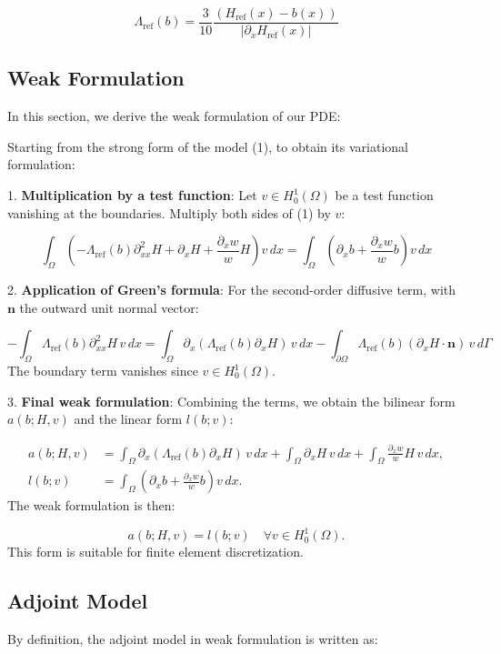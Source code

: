 \documentclass{article}
\begin{document}
\[
\Lambda_{\text{ref}}(b) = \frac{3}{10}\frac{(H_{\text{ref}}(x) - b(x))}{|\partial_{x}H_{\text{ref}}(x)|}
\]

\subsection{Weak Formulation}
In this section, we derive the weak formulation of our PDE:

Starting from the strong form of the model (1), to obtain its variational formulation:

1. \textbf{Multiplication by a test function}:  
Let \( v \in H^1_0(\Omega) \) be a test function vanishing at the boundaries. Multiply both sides of (1) by \( v \):

\[
\int_\Omega \left(-\Lambda_{\text{ref}}(b)\partial_{xx}^2H + \partial_xH + \frac{\partial_xw}{w}H\right)v \, dx = \int_\Omega \left(\partial_xb + \frac{\partial_xw}{w}b\right)v \, dx
\]

2. \textbf{Application of Green's formula}:  
For the second-order diffusive term, with \( \mathbf{n} \) the outward unit normal vector:

\[
-\int_\Omega \Lambda_{\text{ref}}(b)\partial_{xx}^2H \, v \, dx = \int_\Omega \partial_x(\Lambda_{\text{ref}}(b)\partial_xH) \, v \, dx - \int_{\partial\Omega} \Lambda_{\text{ref}}(b)(\partial_xH \cdot \mathbf{n}) \, v \, d\Gamma
\]  
The boundary term vanishes since \( v \in H_0^1(\Omega) \).

3. \textbf{Final weak formulation}:  
Combining the terms, we obtain the bilinear form \( a(b; H, v) \) and the linear form \( l(b; v) \):

\[
\boxed{
\begin{aligned}
a(b; H, v) &= \int_\Omega \partial_x(\Lambda_{\text{ref}}(b) \partial_xH) \, v \, dx + \int_\Omega \partial_xH \, v \, dx + \int_\Omega \frac{\partial_xw}{w} H \, v \, dx, \\
l(b; v) &= \int_\Omega \left(\partial_xb + \frac{\partial_xw}{w}b\right)v \, dx.
\end{aligned}
}
\]  
The weak formulation is then:

\[
a(b; H, v) = l(b; v) \quad \forall v \in H^1_0(\Omega). \tag{3}
\]  
This form is suitable for finite element discretization.

\subsection{Adjoint Model}

By definition, the adjoint model in weak formulation is written as:
\end{document}
